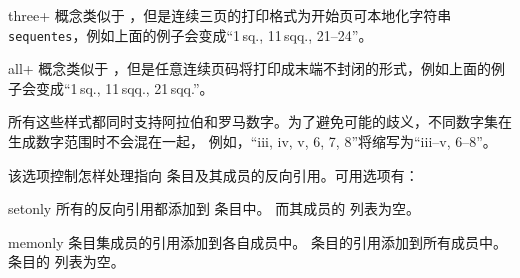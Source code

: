 \begin{optionlist}
\begin{valuelist}
\item[three+] %
概念类似于 ，但是连续三页的打印格式为开始页可本地化字符串 \texttt{sequentes}，例如上面的例子会变成“1\,sq., 11\,sqq., 21--24”。

\item[all+] %
概念类似于 ，但是任意连续页码将打印成末端不封闭的形式，例如上面的例子会变成“1\,sq., 11\,sqq., 21\,sqq.”。

\end{valuelist}

所有这些样式都同时支持阿拉伯和罗马数字。为了避免可能的歧义，不同数字集在生成数字范围时不会混在一起，
例如，“iii, iv, v, 6, 7, 8”将缩写为“iii--v, 6--8”。


该选项控制怎样处理指向  条目及其成员的反向引用。可用选项有：

\begin{valuelist}

\item[setonly] %
所有的反向引用都添加到  条目中。
而其成员的  列表为空。

\item[memonly] %
条目集成员的引用添加到各自成员中。
 条目的引用添加到所有成员中。
 条目的  列表为空。


\end{valuelist}
\end{optionlist}
